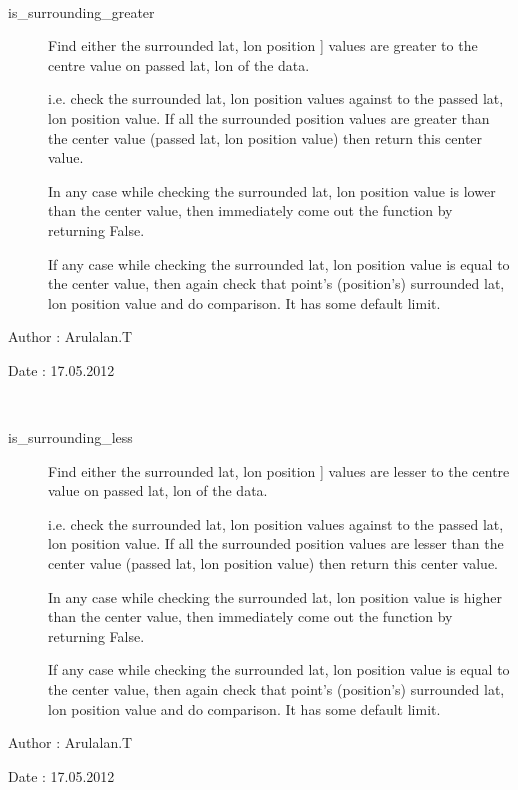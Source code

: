 \documentclass[letterpaper,10pt,english]{sphinxmanual}
\begin{document}
\begin{fulllineitems}
\label{others:weatherutils.is_surrounding_greater}~\begin{description}
\item[{is\_surrounding\_greater}] \leavevmode{[}Find either the surrounded lat, lon position {]}
values are greater to the centre value on passed lat, lon of the data.

i.e. check the surrounded lat, lon position values against to the 
passed lat, lon position value. If all the surrounded position values
are greater than the center value (passed lat, lon position value)
then return this center value.

In any case while checking the surrounded lat, lon position value is 
lower than the center value, then immediately come out the function
by returning False.

If any case while checking the surrounded lat, lon position value is
equal to the center value, then again check that point's (position's)
surrounded lat, lon position value and do comparison. It has some 
default limit.

\end{description}

Author : Arulalan.T

Date : 17.05.2012

\end{fulllineitems}


\begin{fulllineitems}
\label{others:weatherutils.is_surrounding_less}~\begin{description}
\item[{is\_surrounding\_less}] \leavevmode{[}Find either the surrounded lat, lon position {]}
values are lesser to the centre value on passed lat, lon of the data.

i.e. check the surrounded lat, lon position values against to the 
passed lat, lon position value. If all the surrounded position values
are lesser than the center value (passed lat, lon position value)
then return this center value.

In any case while checking the surrounded lat, lon position value is 
higher than the center value, then immediately come out the function
by returning False.

If any case while checking the surrounded lat, lon position value is
equal to the center value, then again check that point's (position's)
surrounded lat, lon position value and do comparison. It has some 
default limit.

\end{description}

Author : Arulalan.T

Date : 17.05.2012

\end{fulllineitems}
\end{document}
